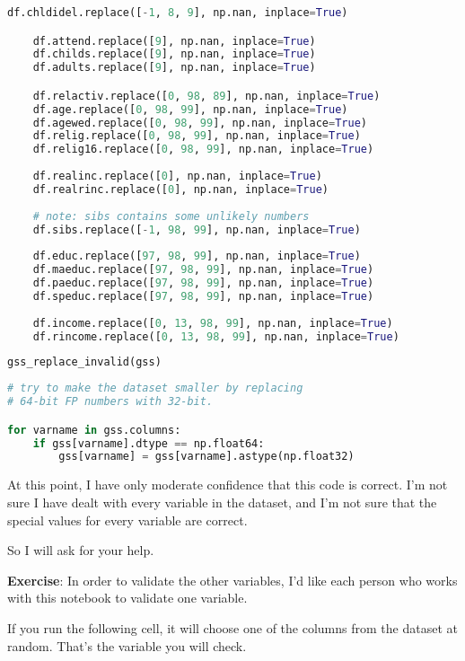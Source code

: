 \begin{lstlisting}[language=Python,style=source]
    df.chldidel.replace([-1, 8, 9], np.nan, inplace=True)

    df.attend.replace([9], np.nan, inplace=True)
    df.childs.replace([9], np.nan, inplace=True)
    df.adults.replace([9], np.nan, inplace=True)

    df.relactiv.replace([0, 98, 89], np.nan, inplace=True)
    df.age.replace([0, 98, 99], np.nan, inplace=True)
    df.agewed.replace([0, 98, 99], np.nan, inplace=True)
    df.relig.replace([0, 98, 99], np.nan, inplace=True)
    df.relig16.replace([0, 98, 99], np.nan, inplace=True)
    
    df.realinc.replace([0], np.nan, inplace=True)                  
    df.realrinc.replace([0], np.nan, inplace=True)                  
    
    # note: sibs contains some unlikely numbers
    df.sibs.replace([-1, 98, 99], np.nan, inplace=True)
    
    df.educ.replace([97, 98, 99], np.nan, inplace=True)
    df.maeduc.replace([97, 98, 99], np.nan, inplace=True)
    df.paeduc.replace([97, 98, 99], np.nan, inplace=True)
    df.speduc.replace([97, 98, 99], np.nan, inplace=True)
    
    df.income.replace([0, 13, 98, 99], np.nan, inplace=True)
    df.rincome.replace([0, 13, 98, 99], np.nan, inplace=True)    
\end{lstlisting}

\begin{lstlisting}[language=Python,style=source]
gss_replace_invalid(gss)
\end{lstlisting}

\begin{lstlisting}[language=Python,style=source]
# try to make the dataset smaller by replacing
# 64-bit FP numbers with 32-bit.

for varname in gss.columns:
    if gss[varname].dtype == np.float64:
        gss[varname] = gss[varname].astype(np.float32)
\end{lstlisting}

At this point, I have only moderate confidence that this code is
correct. I'm not sure I have dealt with every variable in the dataset,
and I'm not sure that the special values for every variable are correct.

So I will ask for your help.

\textbf{Exercise}: In order to validate the other variables, I'd like
each person who works with this notebook to validate one variable.

If you run the following cell, it will choose one of the columns from
the dataset at random. That's the variable you will check.

